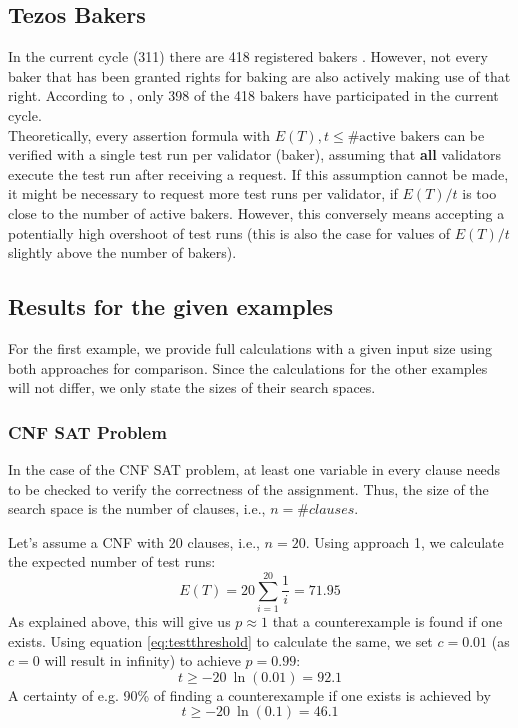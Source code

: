\documentclass{article}
\begin{document}
\subsection{Tezos Bakers}
In the current cycle (311) there are 418 registered bakers \cite{tezos_cycle}. However, not every baker that has been granted rights for baking are also actively making use of that right. According to \cite{bakendorse}, only 398 of the 418 bakers have participated in the current cycle. \\
Theoretically, every assertion formula with $E(T), t \le \text{\#active bakers}$ can be verified with a single test run per validator (baker), assuming that \textbf{all} validators execute the test run after receiving a request. If this assumption cannot be made, it might be necessary to request more test runs per validator, if $E(T)/t$  is too close to the number of active bakers. However, this conversely means accepting a potentially high overshoot of test runs (this is also the case for values of $E(T)/t$ slightly above the number of bakers). 

\subsection{Results for the given examples}
For the first example, we provide full calculations with a given input size using both approaches for comparison. Since the calculations for the other examples will not differ, we only state the sizes of their search spaces.
\subsubsection{CNF SAT Problem}
In the case of the CNF SAT problem, at least one variable in every clause needs to be checked to verify the correctness of the assignment. Thus, the size of the search space is the number of clauses, i.e., $n = \#clauses$.

Let's assume a CNF with 20 clauses, i.e., $n = 20$. Using approach 1, we calculate the expected number of test runs:
\begin{equation*}
    E(T) = 20 \sum_{i=1}^{20} \frac{1}{i} = 71.95
\end{equation*}
As explained above, this will give us $p\approx 1$ that a counterexample is found if one exists. Using equation \ref{eq:testthreshold} to calculate the same, we set $c=0.01$ (as $c = 0$ will result in infinity) to achieve $p=0.99$:
\begin{equation*}
    t \geq -20\:\ln(0.01) = 92.1
\end{equation*}
A certainty of e.g. 90\% of finding a counterexample if one exists is achieved by
\begin{equation*}
    t \geq -20\:\ln(0.1) = 46.1
\end{equation*}
\end{document}
